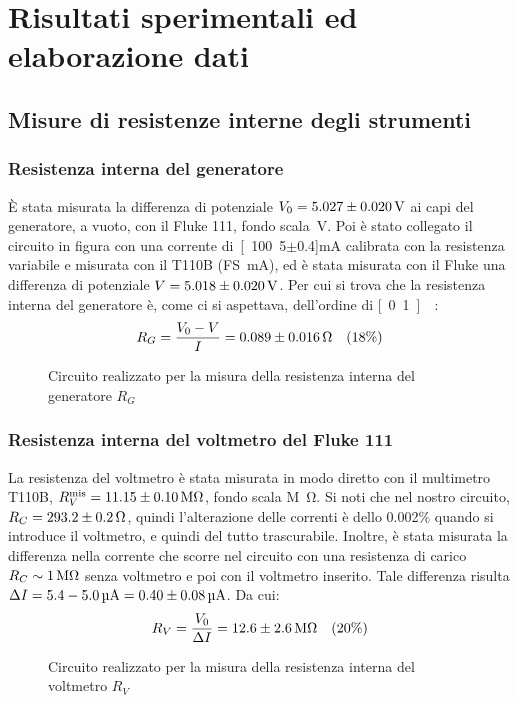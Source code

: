 \documentclass[italian,a4paper]{article}
\begin{document}
\section{Risultati sperimentali ed elaborazione dati}
\subsection{Misure di resistenze interne degli strumenti}
\subsubsection{Resistenza interna del generatore}
\`E stata misurata la differenza di potenziale $V_0 = \unit[5.027\pm0.020]{V}$ ai capi del generatore, a vuoto, con il Fluke 111, fondo scala~\unit[6]{V}. Poi è stato collegato il circuito in figura con una corrente di~\unit[100.5$\pm$0.4]{mA} calibrata con la resistenza variabile e misurata con il T110B (FS~\unit[200]{mA}), ed è stata misurata con il Fluke una differenza di potenziale $V = \unit[5.018\pm0.020]{V}$. Per cui si trova che la resistenza interna del generatore è, come ci si aspettava, dell'ordine di \unit[0.1]{\ohm}:
\begin{equation*}
 R_G = \dfrac{V_0-V}{I} = \unit[0.089\pm0.016]{\ohm} \quad (18\%)
\end{equation*}
\begin{figure}[h]\caption{Circuito realizzato per la misura della resistenza interna del generatore $R_G$}\label{RG}
\centering
 
\end{figure}

\subsubsection{Resistenza interna del voltmetro del Fluke 111}
La resistenza del voltmetro è stata misurata in modo diretto con il multimetro T110B, $R_V^{\text{mis}} = \unit[11.15\pm0.10]{M\ohm}$, fondo scala \unit[20]{M\ohm}. Si noti che nel nostro circuito, $R_C = \unit[293.2\pm0.2]{\ohm}$, quindi l'alterazione delle correnti è dello 0.002\% quando si introduce il voltmetro, e quindi del tutto trascurabile. Inoltre, è stata misurata la differenza nella corrente che scorre nel circuito con una resistenza di carico $R_C \sim \unit[1]{M\ohm}$ senza voltmetro e poi con il voltmetro inserito. Tale differenza risulta $\Delta I = \unit[5.4-5.0]{\micro A} = \unit[0.40\pm0.08]{\micro A}$. Da cui:
\begin{equation*}
  R_V = \dfrac{V_0}{\Delta I} = \unit[12.6\pm2.6]{M\ohm} \quad (20\%)
\end{equation*}
\begin{figure}[h]\caption{Circuito realizzato per la misura della resistenza interna del voltmetro $R_V$}\label{RV}
\centering
 
\end{figure}
\end{document}

